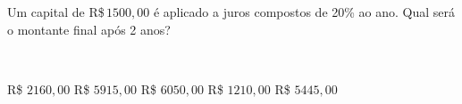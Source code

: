 \parbox{\linewidth}{

Um capital de R\$\,$1500{,}00$ é aplicado a juros compostos de 20\% ao ano. Qual será o montante final após 2 anos?}
\vspace{2mm}
\\\parbox{\linewidth}{

R\$ $2160{,}00$
R\$ $5915{,}00$
R\$ $6050{,}00$
R\$ $1210{,}00$
R\$ $5445{,}00$

}

